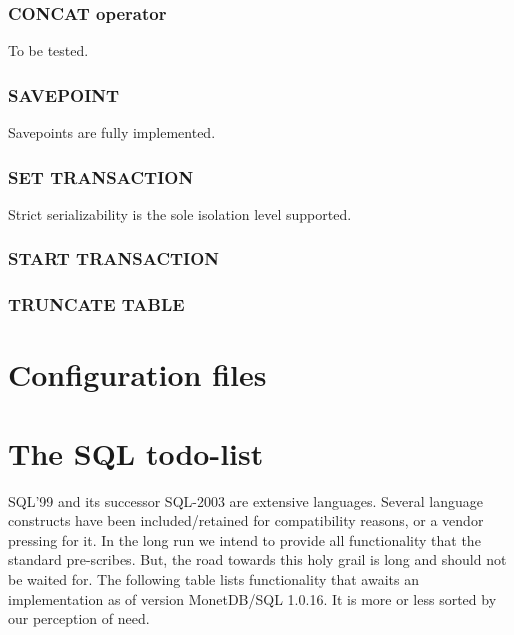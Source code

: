 \documentclass[10pt,twocolumn,fleqn]{article}
\begin{document}
\subsubsection*{CONCAT operator}
To be tested.

\subsubsection*{SAVEPOINT}
Savepoints are fully implemented.

\subsubsection*{SET TRANSACTION}
Strict serializability is the sole isolation level supported.

\subsubsection*{START TRANSACTION}
\subsubsection*{TRUNCATE TABLE}

\section{Configuration files}
\label{configfile}

\section{The SQL todo-list}
SQL'99 and its successor SQL-2003 are extensive languages.
Several language constructs have been included/retained for
compatibility reasons, or a vendor pressing for it.
In the long run we intend to provide all functionality that
the standard pre-scribes. But, the road towards this holy grail
is long and should not be waited for.
The following table lists functionality that awaits an implementation
as of version MonetDB/SQL 1.0.16. It is more or less sorted by
our perception of need.
\end{document}
